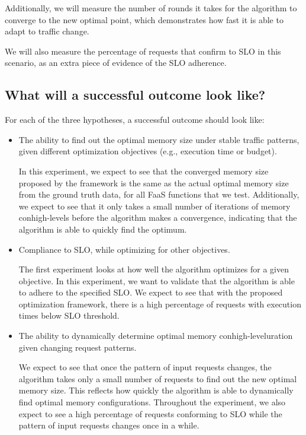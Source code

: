 \documentclass[conference]{IEEEtran}
\begin{document}
\begin{itemize}
Additionally, we will measure the number of rounds it takes for the algorithm to converge to the new optimal point, which demonstrates how fast it is able to adapt to traffic change.

We will also measure the percentage of requests that confirm to SLO in this scenario, as an extra piece of evidence of the SLO adherence.

\end{itemize}


\subsection{What will a successful outcome look like?}
For each of the three hypotheses, a successful outcome should look like:
\begin{itemize}
\item The ability to find out the optimal memory size under stable traffic patterns, given different optimization objectives (e.g., execution time or budget).

In this experiment, we expect to see that the converged memory size proposed by the framework is the same as the actual optimal memory size from the ground truth data, for all FaaS functions that we test. Additionally, we expect to see that it only takes a small number of iterations of memory conhigh-levels before the algorithm makes a convergence, indicating that the algorithm is able to quickly find the optimum.

\item Compliance to SLO, while optimizing for other objectives.

The first experiment looks at how well the algorithm optimizes for a given objective. In this experiment, we want to validate that the algorithm is able to adhere to the specified SLO. We expect to see that with the proposed optimization framework, there is a high percentage of requests with execution times below SLO threshold. 

\item The ability to dynamically determine optimal memory conhigh-leveluration given changing request patterns.

We expect to see that once the pattern of input requests changes, the algorithm takes only a small number of requests to find out the new optimal memory size. This reflects how quickly the algorithm is able to dynamically find optimal memory configurations. Throughout the experiment, we also expect to see a high percentage of requests conforming to SLO while the pattern of input requests changes once in a while.

\end{itemize}








\end{document}
